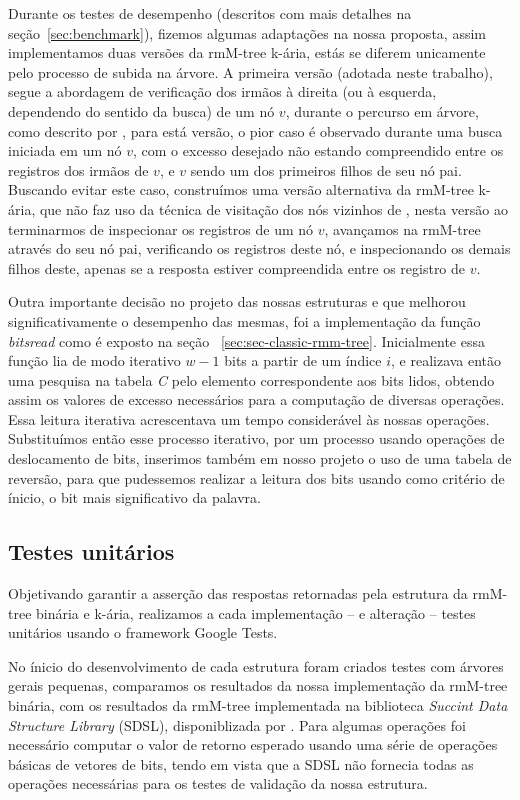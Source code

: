 Durante os testes de desempenho (descritos com mais detalhes na seção~\ref{sec:benchmark}), fizemos algumas adaptações na nossa proposta, assim implementamos duas versões da rmM-tree k-ária, estás se diferem unicamente pelo processo de subida na árvore. A primeira versão (adotada neste trabalho), segue a abordagem de verificação dos irmãos à direita  (ou à esquerda, dependendo do sentido da busca) de um nó $v$, durante o percurso em árvore, como descrito por \citet{book-compact-data-structures}, para está versão, o pior caso é observado durante uma busca iniciada em um nó $v$, com o excesso desejado não estando compreendido entre os registros dos irmãos de $v$, e $v$ sendo um dos primeiros filhos de seu nó pai. Buscando evitar este caso, construímos uma versão alternativa da rmM-tree k-ária, que não faz uso da técnica de visitação dos nós vizinhos de \citet{book-compact-data-structures}, nesta versão ao terminarmos de inspecionar os registros de um nó $v$, avançamos na rmM-tree através do seu nó pai, verificando os registros deste nó, e inspecionando os demais filhos deste, apenas se a resposta estiver compreendida entre os registro de $v$.   

Outra importante decisão no projeto das nossas estruturas e que melhorou significativamente o desempenho das mesmas, foi a implementação da função \textit{bitsread} como é exposto na seção ~\ref{sec:sec-classic-rmm-tree}. Inicialmente essa função lia de modo iterativo $w-1$ bits a partir de um índice $i$, e realizava então uma pesquisa na tabela \textit{C} pelo elemento correspondente aos bits lidos, obtendo assim os valores de excesso necessários para a computação de diversas operações. Essa leitura iterativa acrescentava um tempo considerável às nossas operações. Substituímos então esse processo iterativo, por um processo usando operações de deslocamento de bits, inserimos também em nosso projeto o uso de uma tabela de reversão, para que pudessemos realizar a leitura dos bits usando como critério de ínicio, o bit mais significativo da palavra.

\subsection{Testes unitários}
Objetivando garantir a asserção das respostas retornadas pela estrutura da rmM-tree binária e k-ária, realizamos a cada implementação -- e alteração  -- testes unitários usando o framework Google Tests.

No ínicio do desenvolvimento de cada estrutura foram criados testes com árvores gerais pequenas, comparamos os resultados da nossa implementação da rmM-tree binária, com os resultados da rmM-tree implementada na biblioteca \textit{Succint Data Structure Library} (SDSL), disponiblizada por \citet{sdsl}. Para algumas operações foi necessário computar o valor de retorno esperado usando uma série de operações básicas de vetores de bits, tendo em vista  que a SDSL não fornecia todas as operações necessárias para os testes de validação da nossa estrutura.

